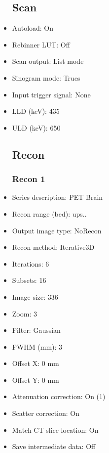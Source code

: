 \documentclass[12pt]{article}
\begin{document}
\begin{itemize}
\subsection{Scan}
\item Autoload: On
\item Rebinner LUT: Off
\item Scan output: List mode
\item Sinogram mode: Trues
\item Input trigger signal: None
\item LLD (keV): 435
\item ULD (keV): 650
\subsection{Recon}

\subsubsection{Recon 1}
\item Series description: PET Brain
\item Recon range (bed): ups..
\item Output image type: NoRecon
\item Recon method: Iterative3D
\item Iterations: 6
\item Subsets: 16
\item Image size: 336
\item Zoom: 3
\item Filter: Gaussian
\item FWHM (mm): 3
\item Offset X: 0 mm
\item Offset Y: 0 mm
\item Attenuation correction: On (1)
\item Scatter correction: On
\item Match CT slice location: On
\item Save intermediate data: Off
\end{itemize}
\end{document}
